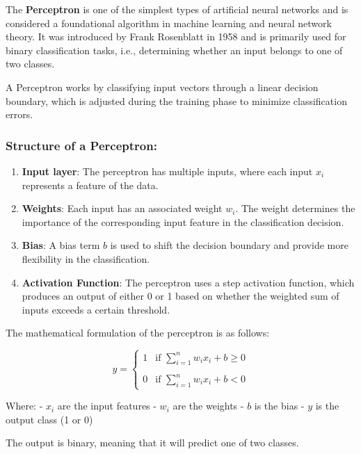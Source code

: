 \documentclass[11pt]{article}
\providecommand{\tightlist}{%
      \setlength{\itemsep}{0pt}\setlength{\parskip}{0pt}}
\begin{document}
    The \textbf{Perceptron} is one of the simplest types of artificial
neural networks and is considered a foundational algorithm in machine
learning and neural network theory. It was introduced by Frank
Rosenblatt in 1958 and is primarily used for binary classification
tasks, i.e., determining whether an input belongs to one of two classes.

A Perceptron works by classifying input vectors through a linear
decision boundary, which is adjusted during the training phase to
minimize classification errors.

\subsubsection{Structure of a
Perceptron:}\label{structure-of-a-perceptron}

\begin{enumerate}
\def\labelenumi{\arabic{enumi}.}
\tightlist
\item
  \textbf{Input layer}: The perceptron has multiple inputs, where each
  input $ x_i $ represents a feature of the data.
\item
  \textbf{Weights}: Each input has an associated weight $ w_i $. The
  weight determines the importance of the corresponding input feature in
  the classification decision.
\item
  \textbf{Bias}: A bias term $ b $ is used to shift the decision
  boundary and provide more flexibility in the classification.
\item
  \textbf{Activation Function}: The perceptron uses a step activation
  function, which produces an output of either 0 or 1 based on whether
  the weighted sum of inputs exceeds a certain threshold.
\end{enumerate}

The mathematical formulation of the perceptron is as follows:

$$
y = \begin{cases} 
1 & \text{if } \sum\limits_{i=1}^{n} w_i x_i + b \geq 0 \\
&\\
0 & \text{if } \sum\limits_{i=1}^{n} w_i x_i + b < 0
\end{cases}
$$

Where: - $ x_i $ are the input features - $ w_i $ are the weights
- $ b $ is the bias - $ y $ is the output class (1 or 0)

The output is binary, meaning that it will predict one of two classes.
\end{document}
